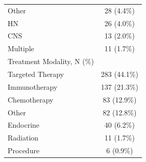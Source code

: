 \begin{table}[htbp]
\begin{tabular}{lc}
  Other & 28 (4.4\%) \\
  HN & 26 (4.0\%) \\
  CNS & 13 (2.0\%) \\
  Multiple & 11 (1.7\%) \\
\addlinespace
Treatment Modality, N (\%) &  \\
  Targeted Therapy & 283 (44.1\%) \\
  Immunotherapy & 137 (21.3\%) \\
  Chemotherapy & 83 (12.9\%) \\
  Other & 82 (12.8\%) \\
  Endocrine & 40 (6.2\%) \\
  Radiation & 11 (1.7\%) \\
  Procedure & 6 (0.9\%) \\
\bottomrule
\end{tabular}
\end{table}
